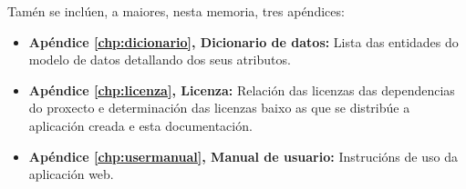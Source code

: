 Tamén se inclúen, a maiores, nesta memoria, tres apéndices:

\begin{itemize}
	\item \textbf{Apéndice \ref{chp:dicionario}, Dicionario de datos:} Lista das entidades do modelo de datos detallando dos seus atributos.
	\item \textbf{Apéndice \ref{chp:licenza}, Licenza:} Relación das licenzas das dependencias do proxecto e determinación das licenzas baixo as que se distribúe a aplicación creada e esta documentación.
	\item \textbf{Apéndice \ref{chp:usermanual}, Manual de usuario:} Instrucións de uso da aplicación web.
\end{itemize}

